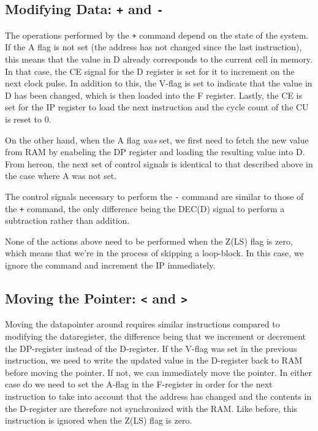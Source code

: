 \subsection{Modifying Data: \texttt{+} and \texttt{-}}
The operations performed by the \texttt{+} command depend on the state of the system. If the A flag is not set (the address has not changed since the last instruction), this means that the value in D already corresponds to the current cell in memory. In that case, the CE signal for the D register is set for it to increment on the next clock pulse. In addition to this, the V-flag is set to indicate that the value in D has been changed, which is then loaded into the F register. Lastly, the CE is set for the IP register to load the next instruction and the cycle count of the CU is reset to 0.

On the other hand, when the A flag \emph{was} set, we first need to fetch the new value from RAM by enabeling the DP register and loading the resulting value into D. From hereon, the next set of control signals is identical to that described above in the case where A was not set.

The control signals necessary to perform the \texttt{-} command are similar to those of the \texttt{+} command, the only difference being the DEC(D) signal to perform a subtraction rather than addition.

None of the actions above need to be performed when the Z(LS) flag is zero, which means that we're in the process of skipping a loop-block. In this case, we ignore the command and increment the IP immediately.

\subsection{Moving the Pointer: \texttt{<} and \texttt{>}}
Moving the datapointer around requires similar instructions compared to modifying the dataregister, the difference being that we increment or decrement the DP-register instead of the D-register. If the V-flag was set in the previous instruction, we need to write the updated value in the D-register back to RAM before moving the pointer. If not, we can immediately move the pointer. In either case do we need to set the A-flag in the F-register in order for the next instruction to take into account that the address has changed and the contents in the D-register are therefore not synchronized with the RAM. Like before, this instruction is ignored when the Z(LS) flag is zero.

